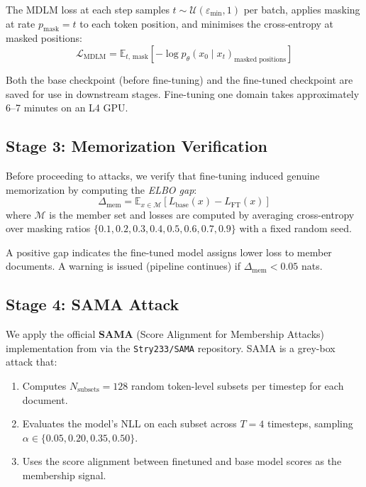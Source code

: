 \documentclass[11pt,a4paper]{article}
\begin{document}
The MDLM loss at each step samples $t \sim \mathcal{U}(\varepsilon_{\min}, 1)$
per batch, applies masking at rate $p_{\text{mask}} = t$ to each token
position, and minimises the cross-entropy at masked positions:
\[
\mathcal{L}_{\text{MDLM}} = \mathbb{E}_{t,\, \text{mask}}\left[
  -\log p_\theta(x_0 \mid x_t)_{\text{masked positions}}
\right]
\]

Both the base checkpoint (before fine-tuning) and the fine-tuned checkpoint
are saved for use in downstream stages. Fine-tuning one domain takes
approximately 6--7 minutes on an L4 GPU.

\subsection{Stage 3: Memorization Verification}
\label{sec:verify}

Before proceeding to attacks, we verify that fine-tuning induced genuine
memorization by computing the \emph{ELBO gap}:
\[
  \Delta_{\text{mem}} = \mathbb{E}_{x \in \mathcal{M}}\left[
    L_{\text{base}}(x) - L_{\text{FT}}(x)
  \right]
\]
where $\mathcal{M}$ is the member set and losses are computed by averaging
cross-entropy over masking ratios
$\{0.1, 0.2, 0.3, 0.4, 0.5, 0.6, 0.7, 0.9\}$ with a fixed random seed.

A positive gap indicates the fine-tuned model assigns lower loss to member
documents. A warning is issued (pipeline continues) if
$\Delta_{\text{mem}} < 0.05$ nats.

\subsection{Stage 4: SAMA Attack}
\label{sec:sama}

We apply the official \textbf{SAMA} (Score Alignment for Membership Attacks)
implementation from \citet{shi2024detecting} via the
\texttt{Stry233/SAMA} repository. SAMA is a grey-box attack that:
\begin{enumerate}[nosep]
  \item Computes $N_{\text{subsets}} = 128$ random token-level subsets per
        timestep for each document.
  \item Evaluates the model's NLL on each subset across $T = 4$ timesteps,
        sampling $\alpha \in \{0.05, 0.20, 0.35, 0.50\}$.
  \item Uses the score alignment between finetuned and base model scores as the
        membership signal.
\end{enumerate}
\end{document}
